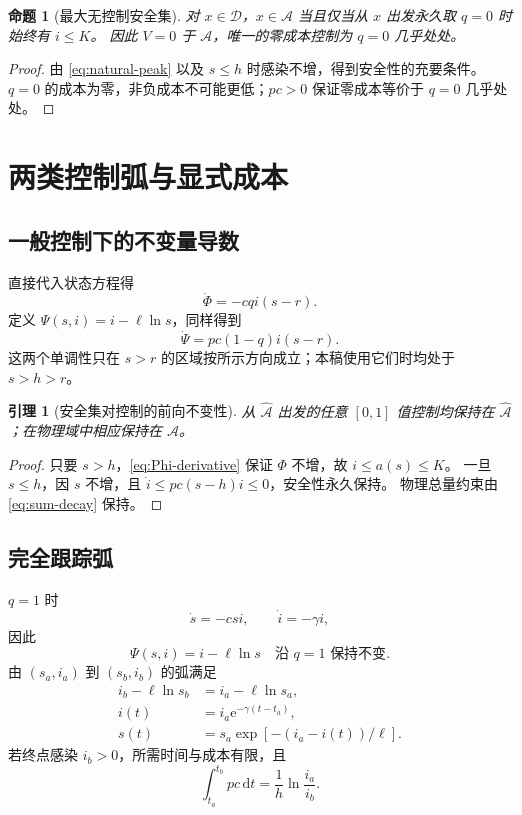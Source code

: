 \documentclass[11pt,a4paper,UTF8]{ctexart}
\newtheorem{proposition}[theorem]{命题}
\newtheorem{lemma}[theorem]{引理}
\theoremstyle{definition}
\newcommand{\Acal}{\mathcal A}
\newcommand{\Dcal}{\mathcal D}
\newcommand{\dd}{\,\mathrm d}
\newcommand{\e}{\mathrm e}
\begin{document}
\begin{proposition}[最大无控制安全集]
\label{prop:safe-exact}
对 $x\in\Dcal$，$x\in\Acal$ 当且仅当从 $x$ 出发永久取 $q=0$ 时始终有 $i\le K$。
因此 $V=0$ 于 $\Acal$，唯一的零成本控制为 $q=0$ 几乎处处。
\end{proposition}
\begin{proof}
由 \eqref{eq:natural-peak} 以及 $s\le h$ 时感染不增，得到安全性的充要条件。
$q=0$ 的成本为零，非负成本不可能更低；$pc>0$ 保证零成本等价于 $q=0$ 几乎处处。
\end{proof}

\section{两类控制弧与显式成本}
\label{sec:arcs}
\subsection{一般控制下的不变量导数}
直接代入状态方程得
\begin{equation}
\boxed{\dot\Phi=-cqi(s-r).}
\label{eq:Phi-derivative}
\end{equation}
定义 $\Psi(s,i)=i-\ell\ln s$，同样得到
\begin{equation}
\dot\Psi=pc(1-q)i(s-r).
\label{eq:Psi-derivative}
\end{equation}
这两个单调性只在 $s>r$ 的区域按所示方向成立；本稿使用它们时均处于 $s>h>r$。

\begin{lemma}[安全集对控制的前向不变性]
\label{lem:safe-invariant}
从 $\widehat{\Acal}$ 出发的任意 $[0,1]$ 值控制均保持在 $\widehat{\Acal}$；在物理域中相应保持在 $\Acal$。
\end{lemma}
\begin{proof}
只要 $s>h$，\eqref{eq:Phi-derivative} 保证 $\Phi$ 不增，故 $i\le a(s)\le K$。
一旦 $s\le h$，因 $s$ 不增，且 $\dot i\le pc(s-h)i\le0$，安全性永久保持。
物理总量约束由 \eqref{eq:sum-decay} 保持。
\end{proof}

\subsection{完全跟踪弧}
$q=1$ 时
\begin{equation}
\dot s=-csi,\qquad \dot i=-\gamma i,
\label{eq:q1-system}
\end{equation}
因此
\begin{equation}
\boxed{\Psi(s,i)=i-\ell\ln s\quad\text{沿 }q=1\text{ 保持不变}.}
\label{eq:Psi}
\end{equation}
由 $(s_a,i_a)$ 到 $(s_b,i_b)$ 的弧满足
\begin{align}
i_b-\ell\ln s_b&=i_a-\ell\ln s_a,
\label{eq:q1-characteristic}\\
i(t)&=i_a\e^{-\gamma(t-t_a)},
\label{eq:q1-i}\\
s(t)&=s_a\exp[-(i_a-i(t))/\ell].
\label{eq:q1-s}
\end{align}
若终点感染 $i_b>0$，所需时间与成本有限，且
\begin{equation}
\int_{t_a}^{t_b}pc\dd t=\frac1h\ln\frac{i_a}{i_b}.
\label{eq:q1-cost}
\end{equation}
\end{document}
